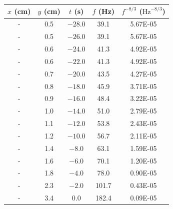 \begin{description}
  \begin{center}
  \begin{tabular}{ccccc}
    \hline
    $x$ (cm) & $y$ (cm) & $t$ (s) & $f$ (Hz) & $f^{-8/3}$ ($\mathrm{Hz}^{-8/3}$) \\
    \hline
    - & 0.5 & $-28.0$ & 39.1 & 5.67E-05 \\
    - & 0.5 & $-26.0$ & 39.1 & 5.67E-05 \\
    - & 0.6 & $-24.0$ & 41.3 & 4.92E-05 \\
    - & 0.6 & $-22.0$ & 41.3 & 4.92E-05 \\
    - & 0.7 & $-20.0$ & 43.5 & 4.27E-05 \\
    - & 0.8 & $-18.0$ & 45.9 & 3.71E-05 \\
    - & 0.9 & $-16.0$ & 48.4 & 3.22E-05 \\
    - & 1.0 & $-14.0$ & 51.0 & 2.79E-05 \\
    - & 1.1 & $-12.0$ & 53.8 & 2.43E-05 \\
    - & 1.2 & $-10.0$ & 56.7 & 2.11E-05 \\
    - & 1.4 & $-8.0$  & 63.1 & 1.59E-05 \\
    - & 1.6 & $-6.0$  & 70.1 & 1.20E-05 \\
    - & 1.8 & $-4.0$  & 78.0 & 0.90E-05 \\
    - & 2.3 & $-2.0$  & 101.7 & 0.43E-05 \\
    - & 3.4 & 0.0     & 182.4 & 0.09E-05 \\
    \hline
  \end{tabular}
  \end{center}
\end{description}

